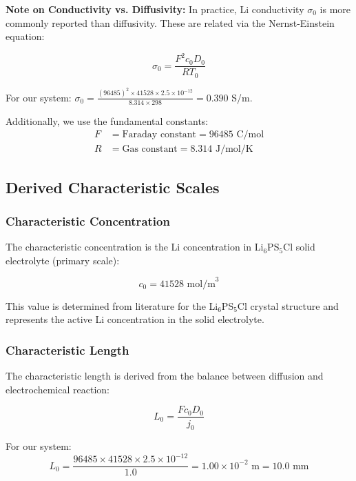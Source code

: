 \documentclass[11pt,a4paper]{article}
\begin{document}
\textbf{Note on Conductivity vs. Diffusivity:} In practice, Li conductivity $\sigma_0$ is more commonly reported than diffusivity. These are related via the Nernst-Einstein equation:

\begin{equation}
\sigma_0 = \frac{F^2 c_0 D_0}{RT_0}
\label{eq:nernst_einstein}
\end{equation}

For our system: $\sigma_0 = \frac{(96485)^2 \times 41528 \times 2.5 \times 10^{-12}}{8.314 \times 298} = 0.390$ S/m.

Additionally, we use the fundamental constants:
\begin{align}
F &= \text{Faraday constant} = 96485 \text{ C/mol} \\
R &= \text{Gas constant} = 8.314 \text{ J/mol/K}
\end{align}

\subsection{Derived Characteristic Scales}

\subsubsection{Characteristic Concentration}

The characteristic concentration is the Li concentration in Li$_6$PS$_5$Cl solid electrolyte (primary scale):

\begin{equation}
c_0 = 41528 \text{ mol/m}^3
\label{eq:c0}
\end{equation}

This value is determined from literature for the Li$_6$PS$_5$Cl crystal structure and represents the active Li concentration in the solid electrolyte.

\subsubsection{Characteristic Length}

The characteristic length is derived from the balance between diffusion and electrochemical reaction:

\begin{equation}
L_0 = \frac{F c_0 D_0}{j_0}
\label{eq:L0}
\end{equation}

For our system:
\begin{equation}
L_0 = \frac{96485 \times 41528 \times 2.5 \times 10^{-12}}{1.0} = 1.00 \times 10^{-2} \text{ m} = 10.0 \text{ mm}
\end{equation}
\end{document}
